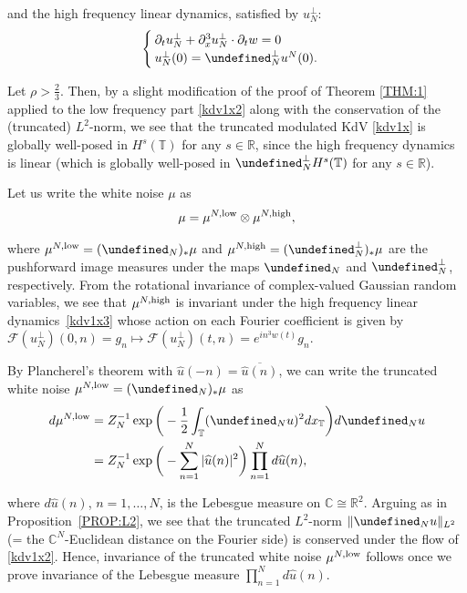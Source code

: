 \documentclass[letterpaper, 11pt,  reqno]{amsart}
\newcommand{\1}{\hspace{0.5mm}\text{I}\hspace{0.5mm}}
\newcommand{\noi}{\noindent}
\newcommand{\R}{\mathbb{R}}
\newcommand{\C}{\mathbb{C}}
\newcommand{\T}{\mathbb{T}}
\let\P= \undefined
\newcommand{\P}{\mathbf{P}}
\newcommand{\F}{\mathcal{F}}
\newcommand{\low}{\textup{low}}
\newcommand{\high}{\textup{high}}
\newcommand{\ft}{\widehat}
\newcommand{\cj}{\overline}
\newcommand{\dx}{\partial_x}
\newcommand{\dt}{\partial_t}
\numberwithin{equation}{section}
\numberwithin{theorem}{section}
\begin{document}
\noi
and the high frequency linear dynamics, 
satisfied by $u_N^\perp$:
\begin{equation}
\begin{cases}
\dt u_N^\perp+  \dx^3 u_N^\perp \cdot \dt w = 0 \\
u_N^\perp(0) = \P_N^\perp u^N(0).
\end{cases}
\label{kdv1x3}
\end{equation}




\noi
Let $\rho > \frac 23$.
Then, by a slight modification of the proof of Theorem \ref{THM:1}
applied to the low frequency part \eqref{kdv1x2}
along with the conservation of the (truncated) $L^2$-norm, 
we see that 
the truncated modulated KdV \eqref{kdv1x}
is globally well-posed in $H^s(\T)$ for any $s \in \R$,
since the high frequency dynamics is linear
(which is globally well-posed in $\P_N^\perp H^s(\T)$ for any $s \in \R$).


Let us write the white noise $\mu$ as 
\begin{align}
 \mu 
  =  \mu^{N, \low} \otimes \mu^{N, \high}, 
\label{white1b}
\end{align}

\noi
where $\mu^{N, \low} = (\P_N)_* \mu$
and  $\mu^{N, \high} = (\P_N^\perp)_* \mu$
are the pushforward image
measures under the maps $\P_N$ and $\P_N^\perp$, 
respectively.
From the rotational invariance of complex-valued Gaussian random variables, we see that 
 $\mu^{N, \high}$ is invariant
under the high frequency linear dynamics~\eqref{kdv1x3}
whose action on each Fourier coefficient is given by 
$\F(u_N^\perp)(0, n) = g_n \mapsto  \F(u_N^\perp)(t, n) = e^{i n^3 w(t)}g_n$.


By Plancherel's theorem with $\ft u(-n) = \cj{\ft u(n)}$, 
we can write  the truncated white noise $\mu^{N, \low} = (\P_N)_*\mu$ as
\begin{align*}
d\mu^{N, \low}
& = Z_N^{-1}
\exp\bigg(- \frac 12 \int_\T (\P_N u)^2 dx_\T\bigg) d\P_N u\\
& = Z_N^{-1}
\exp\bigg(- \sum_{n = 1}^N |\ft u(n)|^2 \bigg) \prod_{n = 1}^N d\ft u(n), 
\end{align*}

\noi
where $d\ft u(n)$, $n = 1, \dots, N$, is the Lebesgue measure on $\C\cong \R^2$.
Arguing as in 
Proposition~\ref{PROP:L2}, 
we see that the truncated $L^2$-norm
$\|\P_N u\|_{L^2}$ 
(= the $\C^N$-Euclidean distance on the Fourier side)
is conserved under the flow of \eqref{kdv1x2}.
Hence, invariance of the truncated white noise 
$\mu^{N, \low}$ follows once we prove invariance of the Lebesgue measure
$\prod_{n = 1}^N d\ft u(n)$.
\end{document}

